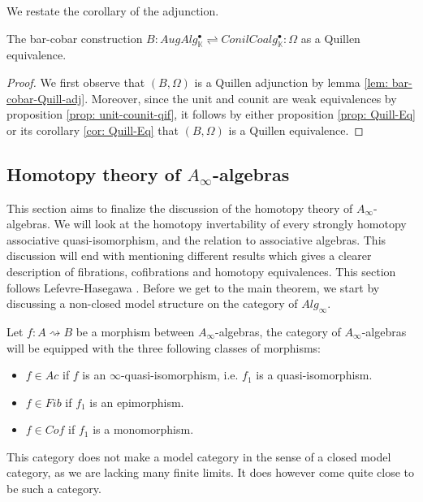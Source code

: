 \documentclass[../thesis.tex]{subfiles}
\begin{document}
        We restate the corollary of the adjunction.
        \begin{corollary}\label{cor: cobar-bar-quill-eq}
            The bar-cobar construction $B: AugAlg^\bullet_\mathbb{K} \rightleftharpoons ConilCoalg^\bullet_\mathbb{K} : \Omega$ as a Quillen equivalence.
        \end{corollary}

        \begin{proof}
            We first observe that $(B, \Omega)$ is a Quillen adjunction by lemma \ref{lem: bar-cobar-Quill-adj}. Moreover, since the unit and counit are weak equivalences by proposition \ref{prop: unit-counit-qif}, it follows by either proposition \ref{prop: Quill-Eq} or its corollary \ref{cor: Quill-Eq} that $(B, \Omega)$ is a Quillen equivalence.
        \end{proof}

    \subsection{Homotopy theory of $A_{\infty}$-algebras}

        This section aims to finalize the discussion of the homotopy theory of $A_{\infty}$-algebras. We will look at the homotopy invertability of every strongly homotopy associative quasi-isomorphism, and the relation to associative algebras. This discussion will end with mentioning different results which gives a clearer description of fibrations, cofibrations and homotopy equivalences. This section follows Lefevre-Hasegawa \cite{LefevreHasegawa03}. Before we get to the main theorem, we start by discussing a non-closed model structure on the category of $Alg_\infty$.

        Let $f: A \rightsquigarrow B$ be a morphism between $A_\infty$-algebras, the category of $A_\infty$-algebras will be equipped with the three following classes of morphisms:
        \begin{itemize}
            \item $f\in Ac$ if $f$ is an $\infty$-quasi-isomorphism, i.e. $f_1$ is a quasi-isomorphism.
            \item $f\in Fib$ if $f_1$ is an epimorphism.
            \item $f\in Cof$ if $f_1$ is a monomorphism.
        \end{itemize}

        This category does not make a model category in the sense of a closed model category, as we are lacking many finite limits. It does however come quite close to be such a category.
\end{document}

